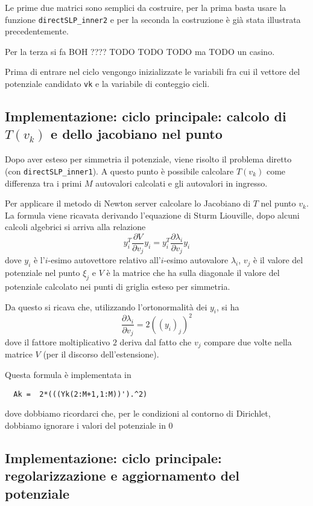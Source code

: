 \documentclass[a4paper,10pt]{article}
\theoremstyle{plain}
\theoremstyle{definition}
\theoremstyle{remark}
\newcommand{\der}[2]{\frac{\partial #1}{\partial #2}}
\begin{document}
Le prime due matrici sono semplici da costruire, per la prima basta
usare la funzione \lstinline{directSLP_inner2} e per la seconda la
  costruzione è già stata illustrata precedentemente.

Per la terza si fa BOH ???? TODO TODO TODO ma TODO un casino.

Prima di entrare nel ciclo vengongo inizializzate le variabili fra cui
il vettore del potenziale candidato \lstinline{vk} e la variabile di
conteggio cicli.


\subsection{Implementazione: ciclo principale: calcolo di $T(v_k)$ e dello jacobiano nel punto}

Dopo aver esteso per simmetria il potenziale, viene risolto il
problema diretto (con \lstinline{directSLP_inner1}). A questo punto è
possibile calcolare $T(v_k)$ come differenza tra i primi $M$ autovalori
calcolati e gli autovalori in ingresso.

Per applicare il metodo di Newton server calcolare lo Jacobiano di $T$
nel punto $v_k$. La formula viene ricavata derivando l'equazione di
Sturm Liouville, dopo alcuni calcoli algebrici si arriva alla
relazione
\begin{equation*}
  y_i ^T \der{V}{v_j} y_i = y_i ^T \der{\lambda _i}{v_j} y_i
\end{equation*}
dove $y_i$ è l'$i$-esimo autovettore relativo all'$i$-esimo autovalore
$\lambda _i$, $v_j$ è il valore del potenziale nel punto $\xi_j$ e $V$
è la matrice che ha sulla diagonale il valore del potenziale calcolato
nei punti di griglia esteso per simmetria.

Da questo si ricava che, utilizzando l'ortonormalità dei $y_i$, si ha
\begin{equation*}
  \der{\lambda _i}{v_j} = 2 ((y_i)_j) ^2
\end{equation*}
dove il fattore moltiplicativo $2$ deriva dal fatto che $v_j$ compare
due volte nella matrice $V$ (per il discorso dell'estensione).

Questa formula è implementata in
\begin{lstlisting}
  Ak =  2*(((Yk(2:M+1,1:M))').^2)
\end{lstlisting}
dove dobbiamo ricordarci che, per le condizioni al contorno di
Dirichlet, dobbiamo ignorare i valori del potenziale in $0$

\subsection{Implementazione: ciclo principale: regolarizzazione e
  aggiornamento del potenziale}
\end{document}
